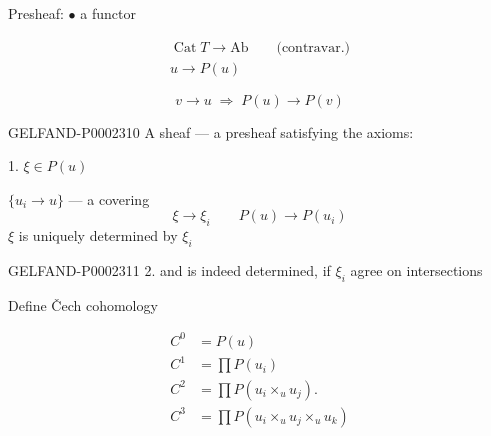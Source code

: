 Presheaf: $\bullet$ a functor



\begin{gather*}
 \operatorname{Cat}T\to\mathrm{Ab}\qquad\text{(contravar.)}\\
 u\to P (u)
\end{gather*}



\begin{equation*}
 v\to u\;\Rightarrow\; P (u)\to P (v)
\end{equation*}



\begin{GelfandAdjacentEvidence}{GELFAND-P000231}{0}
A sheaf — a presheaf satisfying the axioms:



1. $\xi\in P (u)$

$\{u_i\to u\}$ — a covering
\begin{equation*}
 \xi\to\xi_i\qquad P (u)\to P (u_i)
\end{equation*}
$\xi$ is uniquely determined by $\xi_i$




\end{GelfandAdjacentEvidence}
\begin{GelfandAdjacentEvidence}{GELFAND-P000231}{1}
2. and is indeed determined, if $\xi_i$ agree on intersections







\end{GelfandAdjacentEvidence}

Define Čech cohomology



\begin{align*}
 C^0&=P (u)\\
 C^1&=\prod P (u_i)\\
 C^2&=\prod P (u_i\times_u u_j).\\
 C^3&=\prod P (u_i\times_u u_j\times_u u_k)
\end{align*}



